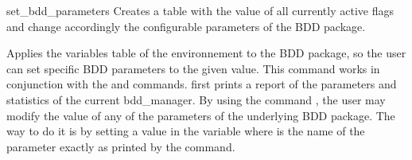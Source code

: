 \begin{nusmvCommand} {set\_bdd\_parameters} {Creates a table with the value of all currently active \nusmvhead flags and change accordingly the configurable parameters of the BDD package.}


Applies the variables table of the \nusmv environnement to the BDD
package, so the user can set specific BDD parameters to the given
value. This command works in conjunction with the
 and  commands.
 first prints a report of the parameters
and statistics of the current bdd\_manager. By using the command
, the user may modify the value of any of the parameters
of the underlying BDD package. The way to do it is by setting a value
in the variable  where  is the name of the parameter exactly as printed by the
 command.

\begin{cmdOpt}
\end{cmdOpt}

\end{nusmvCommand}
